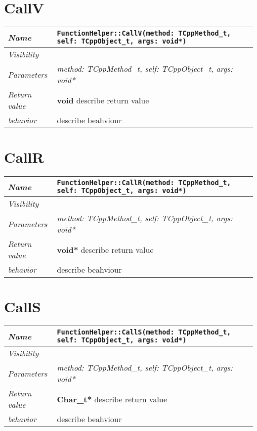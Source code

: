  \section{CallV}
\begin{longtable}{p{3cm} @{\hskip 1cm} p{12cm}}
 \hline
\textit{Name} & \texttt{FunctionHelper::CallV(method: TCppMethod_t, self: TCppObject_t, args: void*)}\\
\hline
 \textit{Visibility} & \\
\hline
\textit{Parameters} & \textit{method: TCppMethod_t, self: TCppObject_t, args: void*}\\
\hline
\textit{Return value} & \textbf{ void} describe return value\\
  \hline
 \textit{behavior} & describe beahviour \\
\hline
\end{longtable} \pagebreak
 \section{CallR}
\begin{longtable}{p{3cm} @{\hskip 1cm} p{12cm}}
 \hline
\textit{Name} & \texttt{FunctionHelper::CallR(method: TCppMethod_t, self: TCppObject_t, args: void*)}\\
\hline
 \textit{Visibility} & \\
\hline
\textit{Parameters} & \textit{method: TCppMethod_t, self: TCppObject_t, args: void*}\\
\hline
\textit{Return value} & \textbf{ void*} describe return value\\
  \hline
 \textit{behavior} & describe beahviour \\
\hline
\end{longtable} \pagebreak
 \section{CallS}
\begin{longtable}{p{3cm} @{\hskip 1cm} p{12cm}}
 \hline
\textit{Name} & \texttt{FunctionHelper::CallS(method: TCppMethod_t, self: TCppObject_t, args: void*)}\\
\hline
 \textit{Visibility} & \\
\hline
\textit{Parameters} & \textit{method: TCppMethod_t, self: TCppObject_t, args: void*}\\
\hline
\textit{Return value} & \textbf{ Char_t*} describe return value\\
  \hline
 \textit{behavior} & describe beahviour \\
\hline
\end{longtable} \pagebreak
